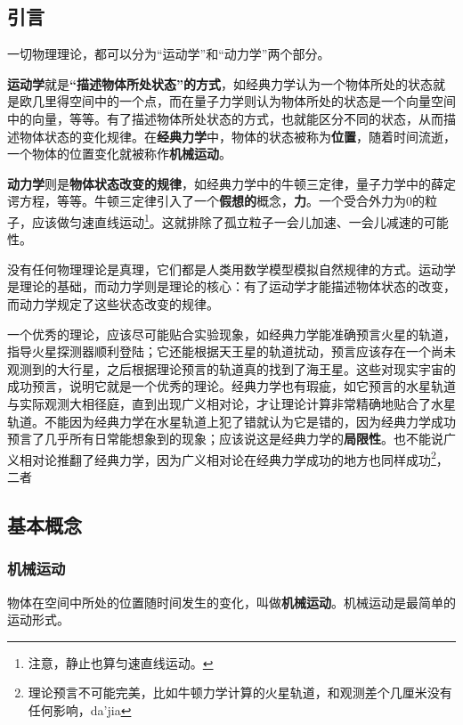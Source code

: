 

\subsection{引言}

一切物理理论，都可以分为“运动学”和“动力学”两个部分。

\textbf{运动学}就是\textbf{“描述物体所处状态”的方式}，如经典力学认为一个物体所处的状态就是欧几里得空间中的一个点，而在量子力学则认为物体所处的状态是一个向量空间中的向量，等等。有了描述物体所处状态的方式，也就能区分不同的状态，从而描述物体状态的变化规律。在\textbf{经典力学}中，物体的状态被称为\textbf{位置}，随着时间流逝，一个物体的位置变化就被称作\textbf{机械运动}。

\textbf{动力学}则是\textbf{物体状态改变的规律}，如经典力学中的牛顿三定律，量子力学中的薛定谔方程，等等。牛顿三定律引入了一个\textbf{假想的}概念，\textbf{力}。一个受合外力为$0$的粒子，应该做匀速直线运动\footnote{注意，静止也算匀速直线运动。}。这就排除了孤立粒子一会儿加速、一会儿减速的可能性。

没有任何物理理论是真理，它们都是人类用数学模型模拟自然规律的方式。运动学是理论的基础，而动力学则是理论的核心：有了运动学才能描述物体状态的改变，而动力学规定了这些状态改变的规律。

一个优秀的理论，应该尽可能贴合实验现象，如经典力学能准确预言火星的轨道，指导火星探测器顺利登陆；它还能根据天王星的轨道扰动，预言应该存在一个尚未观测到的大行星，之后根据理论预言的轨道真的找到了海王星。这些对现实宇宙的成功预言，说明它就是一个优秀的理论。经典力学也有瑕疵，如它预言的水星轨道与实际观测大相径庭，直到出现广义相对论，才让理论计算非常精确地贴合了水星轨道。不能因为经典力学在水星轨道上犯了错就认为它是错的，因为经典力学成功预言了几乎所有日常能想象到的现象；应该说这是经典力学的\textbf{局限性}。也不能说广义相对论推翻了经典力学，因为广义相对论在经典力学成功的地方也同样成功\footnote{理论预言不可能完美，比如牛顿力学计算的火星轨道，和观测差个几厘米没有任何影响，da'jia}，二者


\subsection{基本概念}

\subsubsection{机械运动}
物体在空间中所处的位置随时间发生的变化，叫做\textbf{机械运动}。机械运动是最简单的运动形式。


